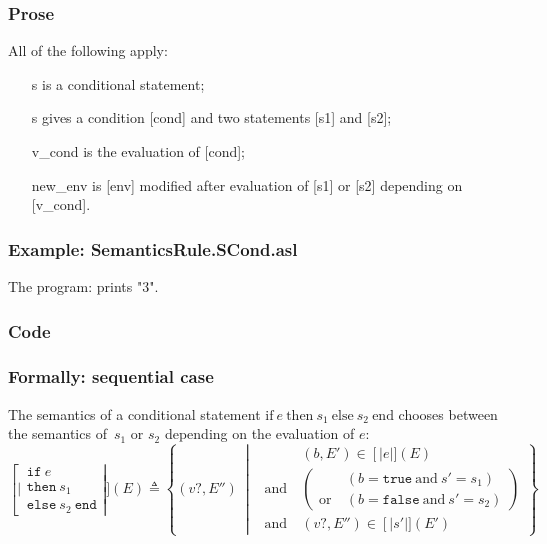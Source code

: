 \documentclass{book}
\newcommand\syntt[1]{\mathtt{#1}}
\newcommand\ife[3]{\text{if}\ #1\ \text{then}\ #2\ \text{else}\ #3\ \text{end}}
\newcommand\llbracket{[|}
\newcommand\rrbracket{|]}
\newcommand\interp[1]{\left\llbracket #1 \right\rrbracket}
\newcommand\st[0]{\ \middle|\ }
\begin{document}
    \subsubsection{Prose}
    All of the following apply:
    \begin{itemize}
    \item [s] is a conditional statement;
    \item [s] gives a condition [cond] and two statements [s1] and [s2];
    \item [v\_cond] is the evaluation of [cond];
    \item [new\_env] is [env] modified after evaluation of [s1] or [s2] depending on
      [v\_cond].
    \end{itemize}

    \subsubsection{Example: SemanticsRule.SCond.asl}
    The program:
    prints "3".

  \subsubsection{Code}

  \subsubsection{Formally: sequential case}
  The semantics of a conditional statement $\ife{e}{s_1}{s_2}$ chooses between
  the semantics of~$s_1$ or $s_2$ depending on the evaluation of $e$:
  \begin{equation}
    \interp{\begin{array}{l}
      \syntt{if}\ e\\
      \syntt{then}\ s_1\\
      \syntt{else}\ s_2\ \syntt{end}
    \end{array}} (E) \triangleq
      \left\{ (v?, E'') \st{} \ 
      \begin{aligned}
        & (b, E') \in \interp{e} (E)
        \\ \text{and}\ &
        \left( \begin{aligned}
          & \left(b = \syntt{true} \ \text{and} \ s' = s_1 \right)
          \\ \text{or}\ &
          \left( b = \syntt{false} \ \text{and}\ s' = s_2 \right)
        \end{aligned} \right)
        \\ \text{and}\ &
        (v?, E'') \in \interp{s'} (E')
      \end{aligned}
      \right\}
    \label{eq:sem-det-scond}
  \end{equation}
\end{document}
